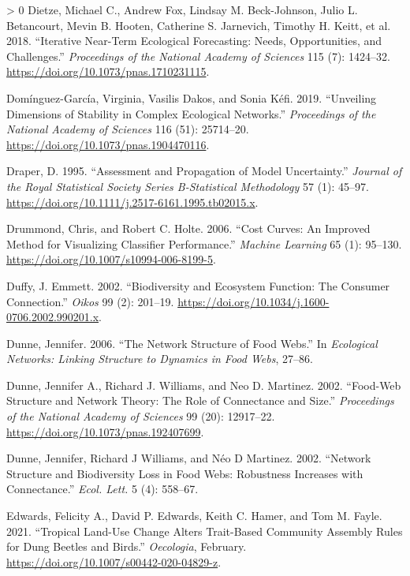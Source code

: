 \documentclass[10pt,oneside]{article}
\newlength{\cslhangindent}
\newenvironment{CSLReferences}[3] %
 {%
  \setlength{\parindent}{0pt}
  \ifodd #1 \everypar{\setlength{\hangindent}{\cslhangindent}}\ignorespaces\fi
  \ifnum #2 > 0
  \setlength{\parskip}{#2\baselineskip}
  \fi
 }%
 {}
\begin{document}
\begin{CSLReferences}{1}{0}
\leavevmode\hypertarget{ref-Dietze2018IteNea}{}%
Dietze, Michael C., Andrew Fox, Lindsay M. Beck-Johnson, Julio L.
Betancourt, Mevin B. Hooten, Catherine S. Jarnevich, Timothy H. Keitt,
et al. 2018. {``Iterative Near-Term Ecological Forecasting: Needs,
Opportunities, and Challenges.''} \emph{Proceedings of the National
Academy of Sciences} 115 (7): 1424--32.
\url{https://doi.org/10.1073/pnas.1710231115}.

\leavevmode\hypertarget{ref-Dominguez-Garcia2019UnvDim}{}%
Domínguez-García, Virginia, Vasilis Dakos, and Sonia Kéfi. 2019.
{``Unveiling Dimensions of Stability in Complex Ecological Networks.''}
\emph{Proceedings of the National Academy of Sciences} 116 (51):
25714--20. \url{https://doi.org/10.1073/pnas.1904470116}.

\leavevmode\hypertarget{ref-Draper1995AssPro}{}%
Draper, D. 1995. {``Assessment and Propagation of Model Uncertainty.''}
\emph{Journal of the Royal Statistical Society Series B-Statistical
Methodology} 57 (1): 45--97.
\url{https://doi.org/10.1111/j.2517-6161.1995.tb02015.x}.

\leavevmode\hypertarget{ref-Drummond2006CosCur}{}%
Drummond, Chris, and Robert C. Holte. 2006. {``Cost Curves: An Improved
Method for Visualizing Classifier Performance.''} \emph{Machine
Learning} 65 (1): 95--130.
\url{https://doi.org/10.1007/s10994-006-8199-5}.

\leavevmode\hypertarget{ref-Duffy2002BioEco}{}%
Duffy, J. Emmett. 2002. {``Biodiversity and Ecosystem Function: The
Consumer Connection.''} \emph{Oikos} 99 (2): 201--19.
\url{https://doi.org/10.1034/j.1600-0706.2002.990201.x}.

\leavevmode\hypertarget{ref-Dunne2006NetStr}{}%
Dunne, Jennifer. 2006. {``The Network Structure of Food Webs.''} In
\emph{Ecological Networks: Linking Structure to Dynamics in Food Webs},
27--86.

\leavevmode\hypertarget{ref-Dunne2002FooStr}{}%
Dunne, Jennifer A., Richard J. Williams, and Neo D. Martinez. 2002.
{``Food-Web Structure and Network Theory: The Role of Connectance and
Size.''} \emph{Proceedings of the National Academy of Sciences} 99 (20):
12917--22. \url{https://doi.org/10.1073/pnas.192407699}.

\leavevmode\hypertarget{ref-Dunne2002NetStr}{}%
Dunne, Jennifer, Richard J Williams, and Néo D Martinez. 2002.
{``Network Structure and Biodiversity Loss in Food Webs: Robustness
Increases with Connectance.''} \emph{Ecol. Lett.} 5 (4): 558--67.

\leavevmode\hypertarget{ref-Edwards2021TroLan}{}%
Edwards, Felicity A., David P. Edwards, Keith C. Hamer, and Tom M.
Fayle. 2021. {``Tropical Land-Use Change Alters Trait-Based Community
Assembly Rules for Dung Beetles and Birds.''} \emph{Oecologia},
February. \url{https://doi.org/10.1007/s00442-020-04829-z}.


\end{CSLReferences}
\end{document}
